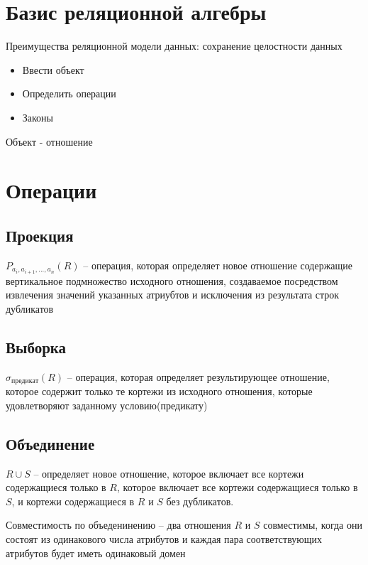 \documentclass[12pt, a4paper]{article}
\begin{document}
\section{Базис реляционной алгебры}

Преимущества реляционной модели данных: сохранение целостности данных

\begin{itemize}
    \item Ввести объект
    \item Определить операции
    \item Законы
\end{itemize}

Объект - отношение

\section{Операции}

\subsection{Проекция}

$P_{a_i, a_{i + 1}, ..., a_n} (R)$ -- операция, которая определяет новое отношение содержащие вертикальное подмножество исходного отношения, создаваемое посредством извлечения значений указанных атриубтов и исключения из результата строк дубликатов

\subsection{Выборка}

$\sigma_{предикат} (R)$ -- операция, которая определяет результирующее отношение, которое содержит только те кортежи из исходного отношения, которые удовлетворяют заданному условию(предикату)

\subsection{Объединение}

$R \cup S$ -- определяет новое отношение, которое включает все кортежи содержащиеся только в $R$, которое включает все кортежи содержащиеся только в $S$, и кортежи содержащиеся в $R$ и $S$ без дубликатов.

Совместимость по объеденинению -- два отношения $R$ и $S$ совместимы, когда они состоят из одинакового числа атрибутов и каждая пара соответствующих атрибутов будет иметь одинаковый домен
\end{document}
